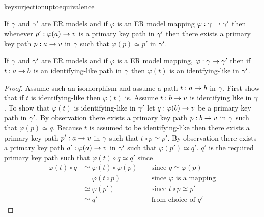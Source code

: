 keysurjectionuptoequivalence
\begin{observation}
If $\gamma$ and $\gamma'$ are ER models and if $\varphi$ is an ER model mapping $\varphi: \gamma \rightarrow \gamma'$ then whenever $p':\varphi(a) \rightarrow v$ is a primary key path in $\gamma'$ then there exists a primary key path $p:a \rightarrow v$ in $\gamma$ such that $\varphi(p) \simeq p'$ in $\gamma'$.
\end{observation}
 
\begin{lemma}
If $\gamma$ and $\gamma'$ are ER models and  if  $\varphi$ is a ER model mapping, $\varphi: \gamma \rightarrow \gamma'$ then if $t:a \rightarrow b$ is an identifying-like  path in $\gamma$ then $\varphi(t)$ is an identfying-like in $\gamma'$.
\end{lemma}

\begin{proof}
Assume such an isomorphism and assume a path $t: a \rightarrow b$ in $\gamma$. 
First show that if $t$ is identifying-like then $\varphi(t)$ is. Assume $t: b \rightarrow v$ is identifying like in $\gamma$. To show that $\varphi(t)$
is identifying-like in $\gamma'$ let $q : \varphi(b) \rightarrow v$ be a primary key path in $\gamma'$. By observation  there exists a primary key path $p : b \rightarrow v$ in $\gamma$ such that $\varphi(p) \simeq q$. Because $t$ is assumed to be identifying-like then there exists a primary key path $p': a  \rightarrow  v$ in $\gamma$ such that $t \circ p \simeq p'$. By observation there exists a primary key path $q' : \varphi(a)  \rightarrow  v$ in $\gamma'$
such that $\varphi(p') \simeq q'$. $q'$ is the required primary key path such that $\varphi(t) \circ q \simeq q'$ since
\begin{align*}
\varphi(t) \circ q  & \simeq \varphi(t) \circ \varphi(p)       && \mbox{ since $q \simeq \varphi(p)$}    \\
                    & =      \varphi(t \circ  p)                && \mbox{ since $\varphi$ is a mapping} \\
                    & \simeq \varphi(p')                        && \mbox{ since $t \circ p \simeq p'$}           \\
                    & \simeq q'                                 && \mbox{ from choice of $q'$}   
\end{align*}
\end{proof}

